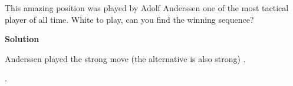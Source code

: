 \documentclass{article}
\begin{document}
This amazing position was played by Adolf Anderssen one of the most tactical player of all time. White to play, can you find the winning sequence?

\newgame




\begin{center}
\showboard
\end{center}

\textbf{Solution}

Anderssen played the strong move  (the alternative  is also strong) .

\begin{center}
\showboard
\end{center}
 
.


\begin{center}
\showboard
\end{center}
\end{document}
